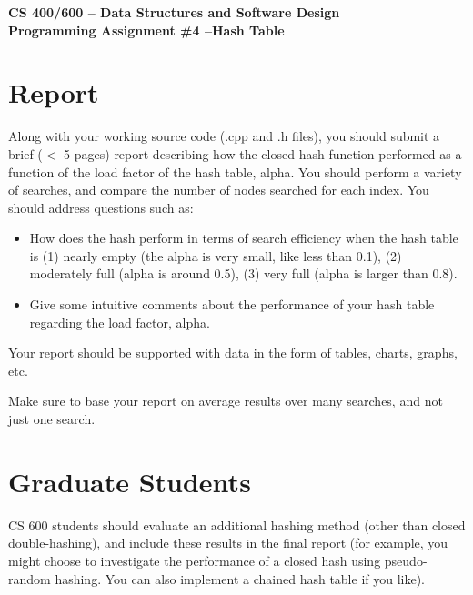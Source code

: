 \documentclass{article}
\begin{document}
\begin{center}
\textbf{{\Large CS 400/600 – Data Structures and Software Design} \\
{\large Programming Assignment \#4 –Hash Table}}
\end{center}

\section*{Report}
Along with your working source code (.cpp and .h files), you should
submit a brief ($<$ 5 pages) report describing how the closed hash
function performed as a function of the load factor of the hash table,
alpha. You should perform a variety of searches, and compare the
number of nodes searched for each index.  You should address questions
such as: 
\begin{itemize}
\item How does the hash perform in terms of search efficiency when the hash
  table is (1) nearly empty (the alpha is very small, like less than
  0.1),  (2) moderately full (alpha is around 0.5),  (3) very full
  (alpha is larger than 0.8). 
\item Give some intuitive comments about the performance of your hash table
  regarding the load factor, alpha.  
\end{itemize}

Your report should be supported with data in the form of tables,
charts, graphs, etc. 

Make sure to base your report on average results over many searches,
and not just one search. 

\section*{Graduate Students}
CS 600 students should evaluate an additional hashing method (other
than closed double-hashing), and include these results in the final
report (for example, you might choose to investigate the performance
of a closed hash using pseudo-random hashing. You can also implement a
chained hash table if you like). 
\end{document}
